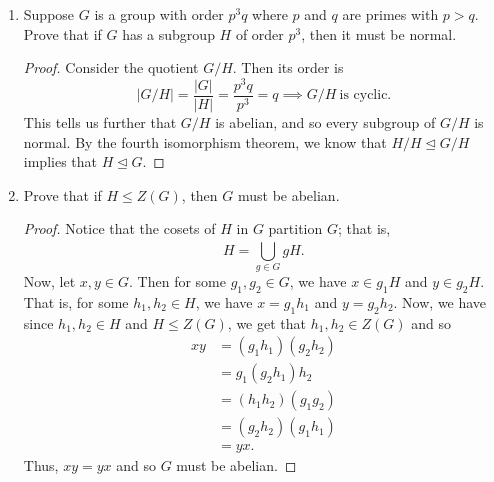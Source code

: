 \documentclass[a4paper]{article}
\begin{document}
\begin{problem}
   \begin{enumerate}
       \item[(a)] Suppose \( G  \) is a group with order \( p^{3} q  \) where \( p  \) and \( q  \) are primes with \( p > q  \). Prove that if \( G  \) has a subgroup \( H  \) of order \( p^{3} \), then it must be normal. 
           \begin{proof}
           Consider the quotient \( G  / H \). Then its order is     
           \[ | G / H  |  = \frac{ | G |  }{ | H |  } = \frac{ p^{3} q  }{ p^{3} } = q \implies G /H \ \text{is cyclic.}    \]
           This tells us further that \( G / H  \) is abelian, and so every subgroup of \( G / H \) is normal. By the fourth isomorphism theorem, we know that \( H / H   \trianglelefteq G / H \) implies that \( H \trianglelefteq G   \).  
           \end{proof}
       \item[(b)] Prove that if \( H \leq Z(G) \), then \( G  \) must be abelian.  
           \begin{proof}
           Notice that the cosets of \( H  \) in \( G  \) partition \( G  \); that is,
           \[  H = \bigcup_{ g \in G  }^{  }  gH. \]
           Now, let \( x,y \in G \). Then for some \( {g}_{1}, {g}_{2} \in G  \), we have \( x \in {g}_{1} H  \) and \( y \in {g}_{2} H  \). That is, for some \( {h}_{1}, {h}_{2} \in H  \), we have \( x = {g}_{1} {h}_{1} \) and \( y = {g}_{2} {h}_{2} \). Now, we have since \( {h}_{1}, {h}_{2} \in H \) and \( H \leq Z(G) \), we get that \( {h}_{1}, {h}_{2} \in Z(G) \) and so  
           \begin{align*}
               xy &= ({g}_{1}{h}_{1})({g}_{2} {h}_{2})  \\
                  &= {g}_{1}({g}_{2}{h}_{1}){h}_{2} \\
                  &= ({h}_{1}{h}_{2})({g}_{1}{g}_{2}) \\
                  &= ({g}_{2}{h}_{2})({g}_{1}{h}_{1}) \\
                  &= yx.
           \end{align*}
           Thus, \( xy = yx  \) and so \(  G  \) must be abelian. 
           \end{proof}
   \end{enumerate}  
\end{problem}
\vspace{1mm}
\end{document}
